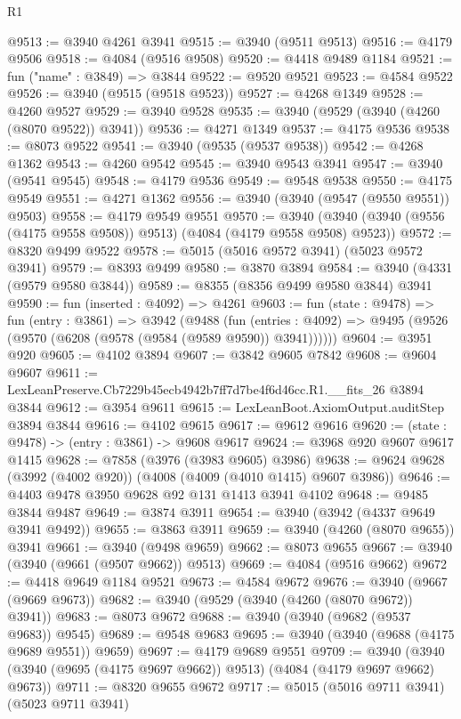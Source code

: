 \begin{lexlean}{R1}
\begin{coremodule}
@9513 := @3940 @4261 @3941
@9515 := @3940 (@9511 @9513)
@9516 := @4179 @9506
@9518 := @4084 (@9516 @9508)
@9520 := @4418 @9489 @1184
@9521 := fun ("name" : @3849) => @3844
@9522 := @9520 @9521
@9523 := @4584 @9522
@9526 := @3940 (@9515 (@9518 @9523))
@9527 := @4268 @1349
@9528 := @4260 @9527
@9529 := @3940 @9528
@9535 := @3940 (@9529 (@3940 (@4260 (@8070 @9522)) @3941))
@9536 := @4271 @1349
@9537 := @4175 @9536
@9538 := @8073 @9522
@9541 := @3940 (@9535 (@9537 @9538))
@9542 := @4268 @1362
@9543 := @4260 @9542
@9545 := @3940 @9543 @3941
@9547 := @3940 (@9541 @9545)
@9548 := @4179 @9536
@9549 := @9548 @9538
@9550 := @4175 @9549
@9551 := @4271 @1362
@9556 := @3940 (@3940 (@9547 (@9550 @9551)) @9503)
@9558 := @4179 @9549 @9551
@9570 := @3940 (@3940 (@3940 (@9556 (@4175 @9558 @9508)) @9513) (@4084 (@4179 @9558 @9508) @9523))
@9572 := @8320 @9499 @9522
@9578 := @5015 (@5016 @9572 @3941) (@5023 @9572 @3941)
@9579 := @8393 @9499
@9580 := @3870 @3894
@9584 := @3940 (@4331 (@9579 @9580 @3844))
@9589 := @8355 (@8356 @9499 @9580 @3844) @3941
@9590 := fun (inserted : @4092) => @4261
@9603 := fun (state : @9478) =>
  fun (entry : @3861) =>
  @3942
    (@9488
      (fun (entries : @4092) => @9495 (@9526 (@9570 (@6208 (@9578 (@9584 (@9589 @9590)) @3941))))))
@9604 := @3951 @920
@9605 := @4102 @3894
@9607 := @3842 @9605 @7842
@9608 := @9604 @9607
@9611 := LexLeanPreserve.Cb7229b45ecb4942b7ff7d7be4f6d46cc.R1.__fits_26 @3894 @3844
@9612 := @3954 @9611
@9615 := LexLeanBoot.AxiomOutput.auditStep @3894 @3844
@9616 := @4102 @9615
@9617 := @9612 @9616
@9620 := (state : @9478) -> (entry : @3861) -> @9608 @9617
@9624 := @3968 @920 @9607 @9617 @1415
@9628 := @7858 (@3976 (@3983 @9605) @3986)
@9638 := @9624 @9628 (@3992 (@4002 @920)) (@4008 (@4009 (@4010 @1415) @9607 @3986))
@9646 := @4403 @9478 @3950 @9628 @92 @131 @1413 @3941 @4102
@9648 := @9485 @3844 @9487
@9649 := @3874 @3911
@9654 := @3940 (@3942 (@4337 @9649 @3941 @9492))
@9655 := @3863 @3911
@9659 := @3940 (@4260 (@8070 @9655)) @3941
@9661 := @3940 (@9498 @9659)
@9662 := @8073 @9655
@9667 := @3940 (@3940 (@9661 (@9507 @9662)) @9513)
@9669 := @4084 (@9516 @9662)
@9672 := @4418 @9649 @1184 @9521
@9673 := @4584 @9672
@9676 := @3940 (@9667 (@9669 @9673))
@9682 := @3940 (@9529 (@3940 (@4260 (@8070 @9672)) @3941))
@9683 := @8073 @9672
@9688 := @3940 (@3940 (@9682 (@9537 @9683)) @9545)
@9689 := @9548 @9683
@9695 := @3940 (@3940 (@9688 (@4175 @9689 @9551)) @9659)
@9697 := @4179 @9689 @9551
@9709 := @3940 (@3940 (@3940 (@9695 (@4175 @9697 @9662)) @9513) (@4084 (@4179 @9697 @9662) @9673))
@9711 := @8320 @9655 @9672
@9717 := @5015 (@5016 @9711 @3941) (@5023 @9711 @3941)

\end{coremodule}
\end{lexlean}
